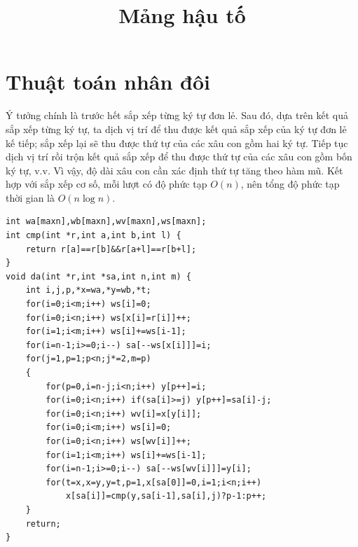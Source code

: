 \documentclass[11pt]{article}
\title{Mảng hậu tố}
\author{}
\date{}
\begin{document}
\maketitle


\section{Thuật toán nhân đôi}

Ý tưởng chính là trước hết sắp xếp từng ký tự đơn lẻ. Sau đó, dựa trên kết quả
sắp xếp từng ký tự, ta dịch vị trí để thu được kết quả sắp xếp của ký tự đơn
lẻ kế tiếp; sắp xếp lại sẽ thu được thứ tự của các xâu con gồm hai ký tự.
Tiếp tục dịch vị trí rồi trộn kết quả sắp xếp để thu được thứ tự của các xâu
con gồm bốn ký tự, v.v. Vì vậy, độ dài xâu con cần xác định thứ tự tăng theo
hàm mũ. Kết hợp với sắp xếp cơ số, mỗi lượt có độ phức tạp $O(n)$, nên tổng
độ phức tạp thời gian là $O(n\log n)$.

\begingroup
\small
\begin{verbatim}
int wa[maxn],wb[maxn],wv[maxn],ws[maxn];
int cmp(int *r,int a,int b,int l) {
    return r[a]==r[b]&&r[a+l]==r[b+l];
}
void da(int *r,int *sa,int n,int m) {
    int i,j,p,*x=wa,*y=wb,*t;
    for(i=0;i<m;i++) ws[i]=0;
    for(i=0;i<n;i++) ws[x[i]=r[i]]++;
    for(i=1;i<m;i++) ws[i]+=ws[i-1];
    for(i=n-1;i>=0;i--) sa[--ws[x[i]]]=i;
    for(j=1,p=1;p<n;j*=2,m=p)
    {
        for(p=0,i=n-j;i<n;i++) y[p++]=i;
        for(i=0;i<n;i++) if(sa[i]>=j) y[p++]=sa[i]-j;
        for(i=0;i<n;i++) wv[i]=x[y[i]];
        for(i=0;i<m;i++) ws[i]=0;
        for(i=0;i<n;i++) ws[wv[i]]++;
        for(i=1;i<m;i++) ws[i]+=ws[i-1];
        for(i=n-1;i>=0;i--) sa[--ws[wv[i]]]=y[i];
        for(t=x,x=y,y=t,p=1,x[sa[0]]=0,i=1;i<n;i++)
            x[sa[i]]=cmp(y,sa[i-1],sa[i],j)?p-1:p++;
    }
    return;
}
\end{verbatim}
\endgroup
\end{document}
